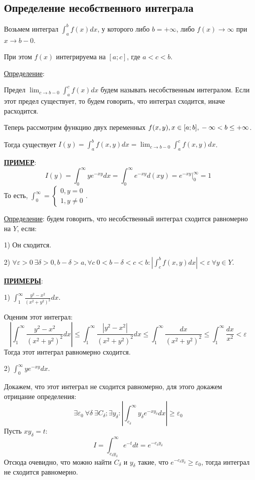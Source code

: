 \documentclass[12pt]{article}
\begin{document}
\subsection{Определение несобственного интеграла}
Возьмем интеграл $\int_a^b f(x) dx$, у которого либо $b = +\infty$, либо $f(x) \to \infty$ при $x\to b-0$.\par
При этом $f(x)$ интегрируема на $[a;c]$, где $a<c<b$.\par
\uline{Определение}:\par
Предел $\lim_{c \to b-0} \int_a^c f(x) dx$ будем называть несобственным интегралом. Если этот предел существует, то будем говорить, что интеграл сходится, иначе расходится.\par
Теперь рассмотрим функцию двух переменных $f(x,y), x \in [a;b],\\ -\infty < b \leq +\infty$.\par
Тогда существует $I(y) = \int_a^b f(x,y) dx = \lim_{c \to b-0} \int_a^c f(x,y) dx$.\par
\uline{\textbf{ПРИМЕР}}:
$$I(y) = \int_0^{\infty} y e^{-xy} dx = \int_0^{\infty} e^{-xy} d(xy) = e^{-xy} |_0^{\infty} = 1$$
То есть, $\int_0^{\infty} = \begin{cases} 0, y = 0 \\ 1, y \neq 0 \end{cases}$.\par
\uline{Определение}: будем говорить, что несобственный интеграл сходится равномерно на $Y$, если:\par
1) Он сходится.\par
2) $\forall \varepsilon > 0 \ \exists \delta > 0, b-\delta > a, \forall c  \ 0 < b - \delta < c < b : | \int_c^b f(x,y) dx| < \varepsilon \ \forall y \in Y$.\par
\uline{\textbf{ПРИМЕРЫ}}:\par
1) $\int_1^\infty \frac{y^2-x^2}{(x^2+y^2)^2} dx$.\par
Оценим этот интеграл:
$$|\int_1^\infty \frac{y^2-x^2}{(x^2+y^2)^2} dx| \leq \int_1^\infty \frac{|y^2-x^2|}{(x^2+y^2)^2} dx \leq \int_1^\infty \frac{dx}{(x^2+y^2)^2} \leq \int_1^\infty \frac{dx}{x^2} < \varepsilon$$
Тогда этот интеграл равномерно сходится.\par
2) $\int_0^{\infty} y e^{-xy} dx$.\par
Докажем, что этот интеграл не сходится равномерно, для этого докажем отрицание определения:
$$\exists \varepsilon_0 \ \forall \delta \ \exists C_\delta; \exists y_\delta : |\int_{c_\delta}^\infty y_\delta e^{-xy_\delta} dx | \geq \varepsilon_0$$
Пусть $xy_\delta = t$:
$$I = \int_{c_\delta y_\delta}^\infty e^{-t} dt = e^{-c_\delta y_\delta}$$
Отсюда очевидно, что можно найти $C_\delta$ и $y_\delta$ такие, что $e^{-c_\delta y_\delta} \geq \varepsilon_0$, тогда интеграл не сходится равномерно.\par
\end{document}
